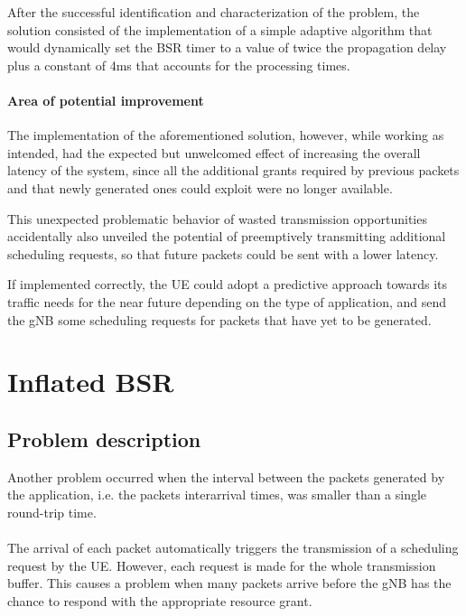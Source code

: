 After the successful identification and characterization of the problem, the  solution consisted of the implementation of a simple adaptive algorithm that would dynamically set the \ac{BSR} timer to a value of twice the propagation delay plus a constant of 4ms that accounts for the processing times.

\paragraph{Area of potential improvement}
The implementation of the aforementioned solution, however, while working as intended, had the expected but unwelcomed effect of increasing the overall latency of the system, since all the additional grants required by previous packets and that newly generated ones could exploit were no longer available.

This unexpected problematic behavior of wasted transmission opportunities accidentally also unveiled the potential of preemptively transmitting additional scheduling requests, so that future packets could be sent with a lower latency.

If implemented correctly, the \ac{UE} could adopt a predictive approach towards its traffic needs for the near future depending on the type of application, and send the \ac{gNB} some scheduling requests for packets that have yet to be generated.

\section{Inflated BSR}
\label{sec:inf-bsr}

\subsection{Problem description}
Another problem occurred when the interval between the packets generated by the application, i.e. the packets interarrival times, was smaller than a single round-trip time. 

\paragraph{}
The arrival of each packet automatically triggers the transmission of a scheduling request by the \ac{UE}. However, each request is made for the whole transmission buffer. This causes a problem when many packets arrive before the \ac{gNB} has the chance to respond with the appropriate resource grant.

